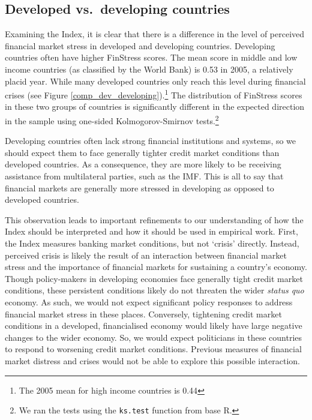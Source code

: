 \documentclass[]{article}
\begin{document}
\clearpage

\subsection{Developed vs.~developing
countries}\label{developed-vs.developing-countries}

Examining the Index, it is clear that there is a difference in the level of perceived financial market stress in developed and developing countries. Developing countries often have higher FinStress scores. The mean score in middle and low income countries (as classified by the World Bank) is 0.53 in 2005, a relatively placid year. While many developed countries only reach this level during financial crises (see Figure \ref{comp_dev_developing}).\footnote{The 2005 mean for high income countries is 0.44} The distribution of FinStress scores in these two groups of countries is significantly different in the expected direction in the sample using one-sided Kolmogorov-Smirnov tests.\footnote{We ran the tests using the \texttt{ks.test} function from base R.}

Developing countries often lack strong financial institutions and systems, so we should expect them to face generally tighter credit market conditions than developed countries. As a consequence, they are more likely to be receiving assistance from multilateral parties, such as the IMF. This is all to say that financial markets are generally more stressed in developing as opposed to developed countries.

This observation leads to important refinements to our understanding of how the Index should be interpreted and how it should be used in empirical work. First, the Index measures banking market conditions, but not `crisis' directly. Instead, perceived crisis is likely the result of an interaction between financial market stress and the importance of financial markets for sustaining a country's economy. Though policy-makers in developing economies face generally tight credit market conditions, these persistent conditions likely do not threaten the wider \emph{status quo} economy. As such, we would not expect significant policy responses to address financial market stress in these places. Conversely, tightening credit market conditions in a developed, financialised economy would likely have large negative changes to the wider economy. So, we would expect politicians in these countries to respond to worsening credit market conditions. Previous measures of financial market distress and crises would not be able to explore this possible interaction.
\end{document}
